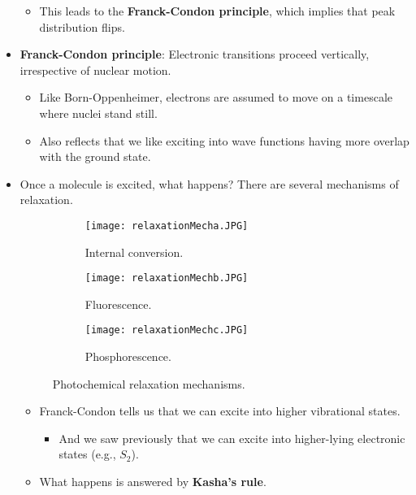 \documentclass[../notes.tex]{subfiles}
\begin{document}
\begin{itemize}
\begin{itemize}
        \item This leads to the \textbf{Franck-Condon principle}, which implies that peak distribution flips.
    \end{itemize}
    \item \textbf{Franck-Condon principle}: Electronic transitions proceed vertically, irrespective of nuclear motion.
    \begin{itemize}
        \item Like Born-Oppenheimer, electrons are assumed to move on a timescale where nuclei stand still.
        \item Also reflects that we like exciting into wave functions having more overlap with the ground state.
    \end{itemize}
    \item Once a molecule is excited, what happens? There are several mechanisms of relaxation.
    \begin{figure}[H]
        \centering
        \begin{subfigure}[b]{0.33\linewidth}
            \centering
            \texttt{[image: relaxationMecha.JPG]}
            \caption{Internal conversion.}
            \label{fig:relaxationMecha}
        \end{subfigure}
        \begin{subfigure}[b]{0.32\linewidth}
            \centering
            \texttt{[image: relaxationMechb.JPG]}
            \caption{Fluorescence.}
            \label{fig:relaxationMechb}
        \end{subfigure}
        \begin{subfigure}[b]{0.33\linewidth}
            \centering
            \texttt{[image: relaxationMechc.JPG]}
            \caption{Phosphorescence.}
            \label{fig:relaxationMechc}
        \end{subfigure}
        \caption{Photochemical relaxation mechanisms.}
        \label{fig:relaxationMech}
    \end{figure}
    \begin{itemize}
        \item Franck-Condon tells us that we can excite into higher vibrational states.
        \begin{itemize}
            \item And we saw previously that we can excite into higher-lying electronic states (e.g., $S_2$).
        \end{itemize}
        \item What happens is answered by \textbf{Kasha's rule}.

\end{itemize}
\end{itemize}
\end{document}
